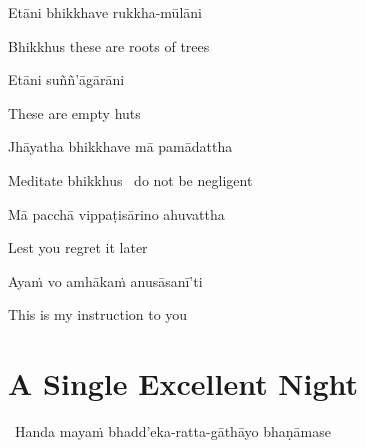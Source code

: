 \begin{verses}
  Etāni bhikkhave rukkha-mūlāni
\end{verses}

\begin{english}
  Bhikkhus these are roots of trees
\end{english}

\begin{verses}
  Etāni suññ'āgārāni
\end{verses}

\begin{english}
  These are empty huts
\end{english}

\begin{verses}
  Jhāyatha bhikkhave mā pamādattha
\end{verses}

\begin{english}
  Meditate bhikkhus \breathmark\ do not be negligent
\end{english}

\begin{verses}
  Mā pacchā vippaṭisārino ahuvattha
\end{verses}

\begin{english}
  Lest you regret it later
\end{english}

\begin{verses}
  Ayaṁ vo amhākaṁ anusāsanī'ti
\end{verses}

\begin{english}
  This is my instruction to you
\end{english}

\suttaRef{[MN 19]}




\section{A Single Excellent Night}
\label{single-excellent-night}

\begin{leader}
  \anglebracketleft\ \hspace{-0.5mm}Handa mayaṁ bhadd'eka-ratta-gāthāyo bhaṇāmase \hspace{-0.5mm}\anglebracketright\
\end{leader}

